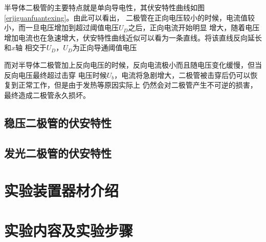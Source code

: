 \documentclass{ctexart}
\begin{document}
    半导体二极管的主要特点就是单向导电性，其伏安特性曲线如图\ref{erjiguanfuantexing}。由此可以看出，
    二极管在正向电压较小的时候，电流值较小，而一旦电压增加到超过阈值电压$U_{D}$之后，正向电流开始明显
    增大，随着电压增加电流也在急速增大，伏安特性曲线近似可以看为一条直线。将该直线反向延长和$x$轴
    相交于$U_{D}$，$U_{D}$为正向导通阈值电压

    而对半导体二极管加上反向电压的时候，反向电流极小而且随电压变化缓慢，但当反向电压最终超过击穿
    电压时候$U_{b}$，电流将急剧增大，二极管被击穿后仍可以恢复到正常工作，但是由于发热等原因实际上
    仍然会对二极管产生不可逆的损害，最终造成二极管永久损坏。
    
  \subsection{稳压二极管的伏安特性}
  \subsection{发光二极管的伏安特性}


\section{实验装置器材介绍}


\section{实验内容及实验步骤}
  \subsection{}
  \subsection{}
  \subsection{}
  \subsection{}
    \subsubsection{}
    \subsubsection{}
\end{document}
